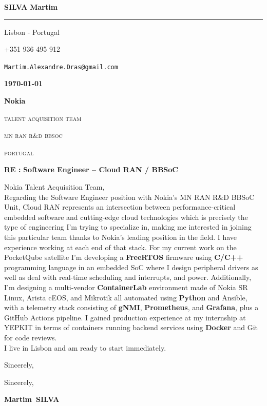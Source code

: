 \documentclass[12pt]{article}
\newcommand{\firstname}{Martim}
\newcommand{\lastname}{Silva}
\newcommand{\mainColor}{nokiaBlue}
\newlength{\spacebox}
\newcommand{\shspace}{\hspace*{0.8em}}
\newcommand{\xvspace}{\vspace*{0.1em}}
\newcommand{\svspace}{\vspace*{0.5em}}
\newcommand{\mvspace}{\vspace*{1.5em}}
\newcommand{\hvspace}{\vspace*{2.5em}}
\newcommand{\negmvspace}{\vspace*{-1em}}
\newcommand{\userInfo}[4]{
    \begin{flushleft}
        \color{\mainColor}
        \Huge
        \textbf{\MakeUppercase{\lastname}}
        \color{black}
        \textbf{\firstname}
        \color{\mainColor}
        \noindent\rule{19.1cm}{0.8pt}
        \color{grayShy}
        \small
        \par
        \parbox{7\spacebox} {
            \faMap \shspace #1 - #2 \par \svspace
            \faPhone \shspace #3 \par \svspace
            \faEnvelopeOpen \shspace \texttt{#4} \par \svspace
        }
        \color{\mainColor}
        \mvspace
    \end{flushleft}
    \negmvspace
}
\newcommand{\companyInfo}[4]{
    \begin{flushright}
        \parbox{4\spacebox}{
            \raggedleft
            \small
            \textbf{\today}\par
            \xvspace
            \textbf{#1}\par
            \mvspace
            \color{grayShy} \textsc{\MakeLowercase{#2}}\par
            \xvspace
            \textsc{\MakeLowercase{#3}}\par
            \xvspace
            \textsc{\MakeLowercase{#4}}\par
            \color{black}
        }
    \end{flushright}
    \hvspace
}
\newcommand{\object}[1]{
    \small
    \color{\mainColor} \textbf{RE :} \color{black} \textbf{#1} \par
}
\newcommand{\content}[2]{
    \mvspace
    \begin{flushleft}
        \parbox{10.3\spacebox}{
          #1\par
          \svspace
          #2
        }\par
    \end{flushleft}
}
\newcommand{\signature}{
    \svspace
    \parbox{3\spacebox}{
      Sincerely,\par
      \svspace \hspace{-0.3em}
      \textbf{\color{\mainColor} \firstname\ \MakeUppercase{\lastname}}\par
      \svspace \svspace
      \Huge \faPenNib\par
    }\par
}
\begin{document}
\selectfont
\userInfo{Lisbon}{Portugal}{+351 936 495 912}{Martim.Alexandre.Dras@gmail.com}
\companyInfo{Nokia}{Talent Acquisition Team}{MN RAN R\&D BBSoC}{Portugal}
\object{Software Engineer -- Cloud RAN / BBSoC}
\content{
  Nokia Talent Acquisition Team, \\

  Regarding the Software Engineer position with Nokia's MN RAN R\&D BBSoC Unit,
  Cloud RAN represents an intersection between performance-critical embedded
  software and cutting-edge cloud technologies which is precisely the type of
  engineering I'm trying to specialize in, making me interested in joining this
  particular team thanks to Nokia's leading position in the field. I have
  experience working at each end of that stack. For my current work on the
  PocketQube satellite I'm developing a \textbf{FreeRTOS} firmware using
  \textbf{C/C++} programming language in an embedded SoC where I design peripheral
  drivers as well as deal with real-time scheduling and interrupts, and power.
  Additionally, I'm designing a multi-vendor \textbf{ContainerLab} environment
  made of Nokia SR Linux, Arista cEOS, and Mikrotik all automated using
  \textbf{Python} and Ansible, with a telemetry stack consisting of \textbf{gNMI},
  \textbf{Prometheus}, and \textbf{Grafana}, plus a GitHub Actions pipeline. I
  gained production experience at my internship at YEPKIT in terms of containers
  running backend services using \textbf{Docker} and Git for code reviews. \\

  I live in Lisbon and am ready to start immediately. \\
}{Sincerely,}
\signature
\end{document}
